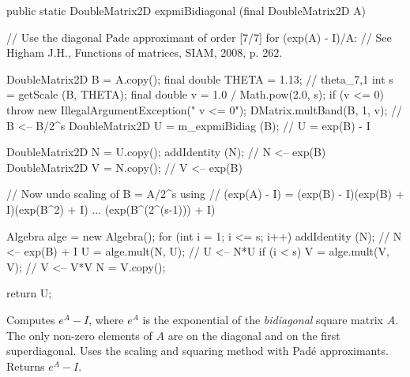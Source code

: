 \begin{code}

   public static DoubleMatrix2D expmiBidiagonal (final DoubleMatrix2D A) \begin{hide} {
      // Use the diagonal Pade approximant of order [7/7] for (exp(A) - I)/A:
      // See Higham J.H., Functions of matrices, SIAM, 2008, p. 262.

      DoubleMatrix2D B = A.copy();
      final double THETA = 1.13; // theta_{7,1}
      int s = getScale (B, THETA);
      final double v = 1.0 / Math.pow(2.0, s);
      if (v <= 0)
         throw new IllegalArgumentException("   v <= 0");
      DMatrix.multBand(B, 1, v);   // B <-- B/2^s
      DoubleMatrix2D U = m_expmiBidiag (B);   // U = exp(B) - I

      DoubleMatrix2D N = U.copy();
      addIdentity (N);                     // N <-- exp(B)
      DoubleMatrix2D V = N.copy();         // V <-- exp(B)

      // Now undo scaling of B = A/2^s using
      // (exp(A) - I) = (exp(B) - I)(exp(B) + I)(exp(B^2) + I) ... (exp(B^(2^(s-1))) + I)

      Algebra alge = new Algebra();
      for (int i = 1; i <= s; i++) {
         addIdentity (N);        // N <-- exp(B) + I
         U = alge.mult(N, U);    // U <-- N*U
         if (i < s) {
            V = alge.mult(V, V);    // V <-- V*V
            N = V.copy();
         }
      }

      return U;
      }\end{hide}
\end{code}
\begin{tabb} Computes $e^A - I$, where $e^A$ is the exponential of the \emph{bidiagonal}
 square matrix $A$. The only non-zero elements of $A$ are on the diagonal and
 on the first superdiagonal.
Uses the scaling and squaring method \cite{mSKA09a,mHIG09a} with
Pad\'e approximants. Returns $e^A - I$.
\end{tabb}
\begin{htmlonly}
\end{htmlonly}
